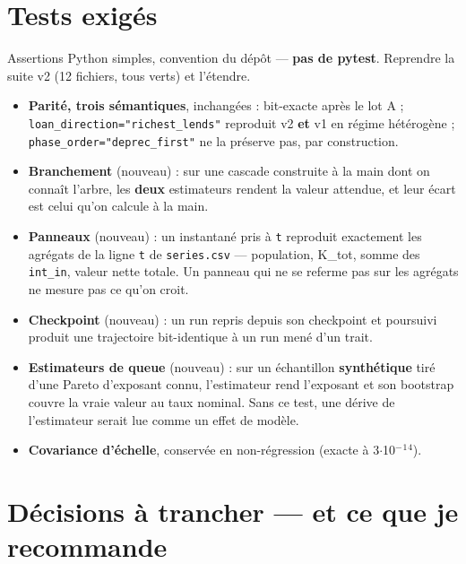 \documentclass[11pt,a4paper]{article}
\newcommand{\code}[1]{\texttt{#1}}
\begin{document}
\bigskip

\setcounter{section}{6}
\section{Tests exigés}

Assertions Python simples, convention du dépôt --- \textbf{pas de pytest}. Reprendre la suite v2 (12 fichiers, tous verts) et l'étendre.

\begin{itemize}
\item \textbf{Parité, trois sémantiques}, inchangées : bit-exacte après le lot A ; \code{loan\_direction="richest\_lends"} reproduit v2 \textbf{et} v1 en régime hétérogène ; \code{phase\_order="deprec\_first"} ne la préserve pas, par construction.
\item \textbf{Branchement} (nouveau) : sur une cascade construite à la main dont on connaît l'arbre, les \textbf{deux} estimateurs rendent la valeur attendue, et leur écart est celui qu'on calcule à la main.
\item \textbf{Panneaux} (nouveau) : un instantané pris à \code{t} reproduit exactement les agrégats de la ligne \code{t} de \code{series.csv} --- population, K\_tot, somme des \code{int\_in}, valeur nette totale. Un panneau qui ne se referme pas sur les agrégats ne mesure pas ce qu'on croit.
\item \textbf{Checkpoint} (nouveau) : un run repris depuis son checkpoint et poursuivi produit une trajectoire bit-identique à un run mené d'un trait.
\item \textbf{Estimateurs de queue} (nouveau) : sur un échantillon \textbf{synthétique} tiré d'une Pareto d'exposant connu, l'estimateur rend l'exposant et son bootstrap couvre la vraie valeur au taux nominal. Sans ce test, une dérive de l'estimateur serait lue comme un effet de modèle.
\item \textbf{Covariance d'échelle}, conservée en non-régression (exacte à 3\ensuremath{\cdot}10\ensuremath{^-}\ensuremath{^1}\ensuremath{^{4}}).
\end{itemize}

\bigskip

\setcounter{section}{7}
\section{Décisions à trancher --- et ce que je recommande}
\end{document}
